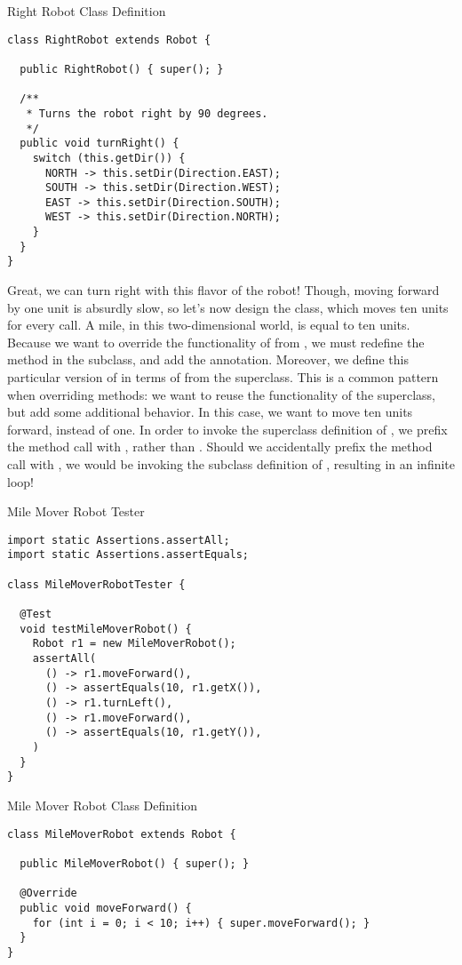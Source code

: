 \begin{cl}{Right Robot Class Definition}
\begin{lstlisting}[language=MyJava]
class RightRobot extends Robot {

  public RightRobot() { super(); }

  /**
   * Turns the robot right by 90 degrees.
   */
  public void turnRight() {
    switch (this.getDir()) {
      NORTH -> this.setDir(Direction.EAST);
      SOUTH -> this.setDir(Direction.WEST);
      EAST -> this.setDir(Direction.SOUTH);
      WEST -> this.setDir(Direction.NORTH);
    }
  }
}
\end{lstlisting}
\end{cl}

Great, we can turn right with this flavor of the robot! Though, moving forward by one unit is absurdly slow, so let's now design the  class, which moves ten units for every  call. A mile, in this two-dimensional world, is equal to ten units. Because we want to override the functionality of  from , we must redefine the method in the subclass, and add the  annotation. Moreover, we define this particular version of  in terms of  from the superclass. This is a common pattern when overriding methods: we want to reuse the functionality of the superclass, but add some additional behavior. In this case, we want to move ten units forward, instead of one. In order to invoke the superclass definition of , we prefix the method call with , rather than . Should we accidentally prefix the method call with , we would be invoking the subclass definition of , resulting in an infinite loop!

\begin{cl}{Mile Mover Robot Tester}
\begin{lstlisting}[language=MyJava]
import static Assertions.assertAll;
import static Assertions.assertEquals;

class MileMoverRobotTester {

  @Test
  void testMileMoverRobot() {
    Robot r1 = new MileMoverRobot();
    assertAll(
      () -> r1.moveForward(),
      () -> assertEquals(10, r1.getX()),
      () -> r1.turnLeft(),
      () -> r1.moveForward(),
      () -> assertEquals(10, r1.getY()),
    )
  }
}
\end{lstlisting}
\end{cl}

\begin{cl}{Mile Mover Robot Class Definition}
\begin{lstlisting}[language=MyJava]
class MileMoverRobot extends Robot {

  public MileMoverRobot() { super(); }

  @Override
  public void moveForward() {
    for (int i = 0; i < 10; i++) { super.moveForward(); }
  }
}
\end{lstlisting}
\end{cl}